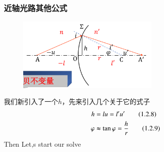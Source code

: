 \subsubsection{近轴光路其他公式}
\begin{figure}[H]
    \centering
    \includegraphics[width=7cm]{img/1.2.png}
\end{figure}
我们新引入了一个$h$，先来引入几个关于它的式子
\begin{align}
    h       & =lu=l'u' \tag{1.2.8}                               \\
    \varphi & \thickapprox \tan \varphi= \frac{h}{r} \tag{1.2.9}
\end{align}
Then Let,s start our solve
